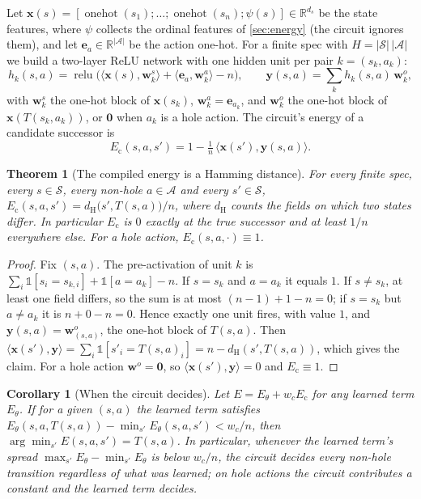 \documentclass{article}
\theoremstyle{plain}
\newtheorem{theorem}{Theorem}
\newtheorem{corollary}{Corollary}
\theoremstyle{definition}
\theoremstyle{remark}
\newcommand{\Sset}{\mathcal{S}}
\newcommand{\Aset}{\mathcal{A}}
\newcommand{\onehot}{\operatorname{onehot}}
\newcommand{\relu}{\operatorname{relu}}
\newcommand{\dH}{d_{\mathrm{H}}}
\newcommand{\Ec}{E_{\mathrm{c}}}
\newcommand{\Eth}{E_{\theta}}
\newcommand{\bx}{\mathbf{x}}
\newcommand{\be}{\mathbf{e}}
\newcommand{\R}{\mathbb{R}}
\newcommand{\ind}[1]{\mathbb{1}[#1]}
\begin{document}
Let $\bx(s)=[\onehot(s_1);\dots;\onehot(s_n);\psi(s)]\in\R^{d_s}$ be the state features, where $\psi$ collects the ordinal features of \cref{sec:energy} (the circuit ignores them), and let $\be_a\in\R^{|\Aset|}$ be the action one-hot. For a finite spec with $H=|\Sset|\,|\Aset|$ we build a two-layer ReLU network with one hidden unit per pair $k=(s_k,a_k)$:
\begin{equation}
\label{eq:circuit}
h_k(s,a)=\relu\!\big(\langle \bx(s),\mathbf{w}^s_k\rangle+\langle \be_a,\mathbf{w}^a_k\rangle-n\big),\qquad
\mathbf{y}(s,a)=\textstyle\sum_k h_k(s,a)\,\mathbf{w}^o_k,
\end{equation}
with $\mathbf{w}^s_k$ the one-hot block of $\bx(s_k)$, $\mathbf{w}^a_k=\be_{a_k}$, and $\mathbf{w}^o_k$ the one-hot block of $\bx(T(s_k,a_k))$, or $\mathbf{0}$ when $a_k$ is a hole action. The circuit's energy of a candidate successor is
\begin{equation}
\label{eq:circuit-energy}
\Ec(s,a,s')=1-\tfrac{1}{n}\,\langle \bx(s'),\mathbf{y}(s,a)\rangle .
\end{equation}

\begin{theorem}[The compiled energy is a Hamming distance]
\label{thm:circuit}
For every finite spec, every $s\in\Sset$, every non-hole $a\in\Aset$ and every $s'\in\Sset$,
$\Ec(s,a,s')=\dH\big(s',T(s,a)\big)/n$, where $\dH$ counts the fields on which two states differ. In particular $\Ec$ is $0$ exactly at the true successor and at least $1/n$ everywhere else. For a hole action, $\Ec(s,a,\cdot)\equiv 1$.
\end{theorem}
\begin{proof}
Fix $(s,a)$. The pre-activation of unit $k$ is $\sum_i \ind{s_i=s_{k,i}}+\ind{a=a_k}-n$. If $s=s_k$ and $a=a_k$ it equals $1$. If $s\neq s_k$, at least one field differs, so the sum is at most $(n-1)+1-n=0$; if $s=s_k$ but $a\neq a_k$ it is $n+0-n=0$. Hence exactly one unit fires, with value $1$, and $\mathbf{y}(s,a)=\mathbf{w}^o_{(s,a)}$, the one-hot block of $T(s,a)$. Then $\langle\bx(s'),\mathbf{y}\rangle=\sum_i\ind{s'_i=T(s,a)_i}=n-\dH(s',T(s,a))$, which gives the claim. For a hole action $\mathbf{w}^o=\mathbf{0}$, so $\langle\bx(s'),\mathbf{y}\rangle=0$ and $\Ec\equiv1$.
\end{proof}

\begin{corollary}[When the circuit decides]
\label{cor:dominate}
Let $E=\Eth+w_c\Ec$ for any learned term $\Eth$. If for a given $(s,a)$ the learned term satisfies $\Eth(s,a,T(s,a))-\min_{s'}\Eth(s,a,s')<w_c/n$, then $\arg\min_{s'}E(s,a,s')=T(s,a)$. In particular, whenever the learned term's spread $\max_{s'}\Eth-\min_{s'}\Eth$ is below $w_c/n$, the circuit decides every non-hole transition regardless of what was learned; on hole actions the circuit contributes a constant and the learned term decides.
\end{corollary}
\end{document}
